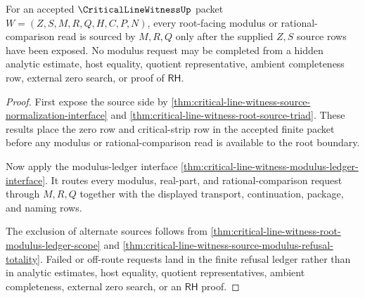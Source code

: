\begin{theorem}
\label{thm:critical-line-witness-root-modulus-source-exactness}
For an accepted $\CriticalLineWitnessUp$ packet
$W=(Z,S,M,R,Q,H,C,P,N)$, every root-facing modulus or rational-comparison read
is sourced by $M,R,Q$ only after the supplied $Z,S$ source rows have been
exposed. No modulus request may be completed from a hidden analytic estimate,
host equality, quotient representative, ambient completeness row, external
zero search, or proof of $\mathsf{RH}$.
\end{theorem}
\begin{proof}
First expose the source side by
\autoref{thm:critical-line-witness-source-normalization-interface} and
\autoref{thm:critical-line-witness-root-source-triad}. These results place the
zero row and critical-strip row in the accepted finite packet before any
modulus or rational-comparison read is available to the root boundary.

Now apply the modulus-ledger interface
\autoref{thm:critical-line-witness-modulus-ledger-interface}. It routes every
modulus, real-part, and rational-comparison request through $M,R,Q$ together
with the displayed transport, continuation, package, and naming rows.

The exclusion of alternate sources follows from
\autoref{thm:critical-line-witness-root-modulus-ledger-scope} and
\autoref{thm:critical-line-witness-source-modulus-refusal-totality}. Failed or
off-route requests land in the finite refusal ledger rather than in analytic
estimates, host equality, quotient representatives, ambient completeness,
external zero search, or an $\mathsf{RH}$ proof.
\end{proof}

